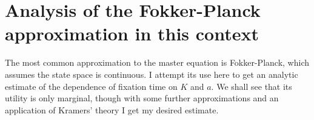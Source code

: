 \section{Analysis of the Fokker-Planck approximation in this context} \label{FPsection}
The most common approximation to the master equation is Fokker-Planck, which assumes the state space is continuous. 
I attempt its use here to get an analytic estimate of the dependence of fixation time on $K$ and $a$. 
We shall see that its utility is only marginal, though with some further approximations and an application of Kramers' theory I get my desired estimate. 


